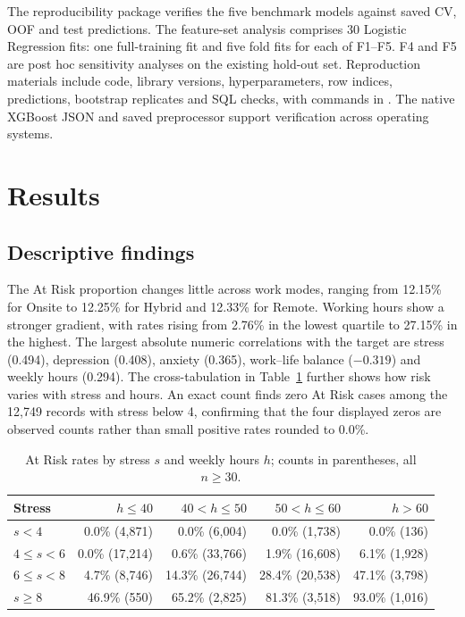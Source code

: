 \documentclass[runningheads]{llncs}
\begin{document}
The reproducibility package verifies the five benchmark models against saved CV, OOF and test predictions. The feature-set analysis comprises 30 Logistic Regression fits: one full-training fit and five fold fits for each of F1--F5. F4 and F5 are post hoc sensitivity analyses on the existing hold-out set. Reproduction materials include code, library versions, hyperparameters, row indices, predictions, bootstrap replicates and SQL checks, with commands in . The native XGBoost JSON and saved preprocessor support verification across operating systems.

\FloatBarrier
\section{Results}
\subsection{Descriptive findings}
The At Risk proportion changes little across work modes, ranging from 12.15\% for Onsite to 12.25\% for Hybrid and 12.33\% for Remote. Working hours show a stronger gradient, with rates rising from 2.76\% in the lowest quartile to 27.15\% in the highest. The largest absolute numeric correlations with the target are stress (0.494), depression (0.408), anxiety (0.365), work--life balance ($-0.319$) and weekly hours (0.294). The cross-tabulation in Table~\ref{tab:heat} further shows how risk varies with stress and hours. An exact count finds zero At Risk cases among the 12,749 records with stress below 4, confirming that the four displayed zeros are observed counts rather than small positive rates rounded to 0.0\%.

\begin{table}[!htbp]\caption{At Risk rates by stress $s$ and weekly hours $h$; counts in parentheses, all $n\geq30$.}\label{tab:heat}\centering\small\begin{tabular}{lrrrr}\toprule Stress & $h\leq40$ & $40<h\leq50$ & $50<h\leq60$ & $h>60$ \\ \midrule
$s<4$ & 0.0\% (4,871) & 0.0\% (6,004) & 0.0\% (1,738) & 0.0\% (136) \\
$4\leq s<6$ & 0.0\% (17,214) & 0.6\% (33,766) & 1.9\% (16,608) & 6.1\% (1,928) \\
$6\leq s<8$ & 4.7\% (8,746) & 14.3\% (26,744) & 28.4\% (20,538) & 47.1\% (3,798) \\
$s\geq8$ & 46.9\% (550) & 65.2\% (2,825) & 81.3\% (3,518) & 93.0\% (1,016) \\
\bottomrule\end{tabular}\end{table}
\end{document}
